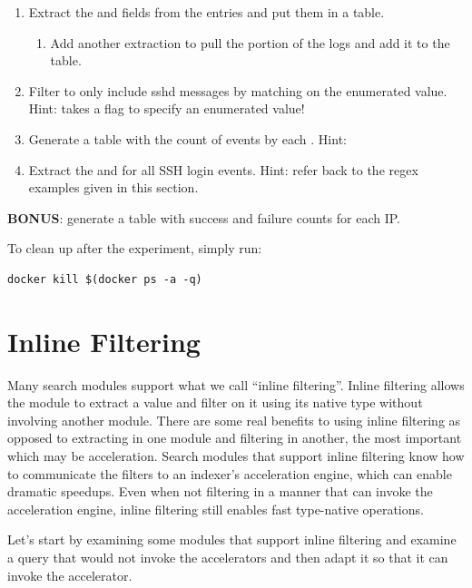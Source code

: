\begin{enumerate}
\item
  Extract the  and  fields from the entries and put them in a
  table.
	\begin{enumerate}
	\item
	  Add another extraction to pull the  portion of the logs and
	  add it to the table.
	\end{enumerate}
\item
  Filter to only include sshd messages by matching on the  enumerated value. Hint:  takes a  flag to specify an enumerated value!
\item
 Generate a table with the count of  events by each . Hint: 
\item
  Extract the  and  for all SSH login events. Hint: refer back to the regex examples given in this section.
\end{enumerate}

\textbf{BONUS}: generate a table with success and failure counts for each IP.

To clean up after the experiment, simply run:

\begin{Verbatim}[breaklines=true]
docker kill $(docker ps -a -q)
\end{Verbatim}

\clearpage
\section{Inline Filtering}
Many search modules support what we call ``inline filtering''. Inline
filtering allows the module to extract a value and filter on it using
its native type without involving another module. There are some real
benefits to using inline filtering as opposed to extracting in one
module and filtering in another, the most important which may be
acceleration. Search modules that support inline filtering know how to
communicate the filters to an indexer's acceleration engine, which can
enable dramatic speedups. Even when not filtering in a manner that can
invoke the acceleration engine, inline filtering still enables fast type-native operations.

Let's start by examining some modules that support inline filtering and
examine a query that would not invoke the accelerators and then adapt it
so that it can invoke the accelerator. 

